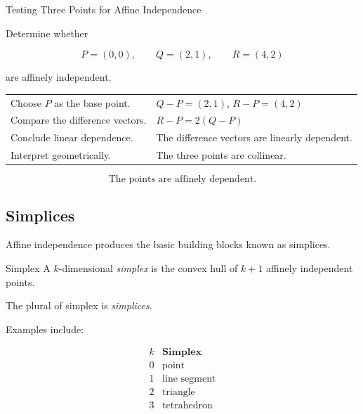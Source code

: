 \begin{workedexamplebox}{Testing Three Points for Affine Independence}

Determine whether

\[
P=(0,0),\qquad
Q=(2,1),\qquad
R=(4,2)
\]

are affinely independent.

\begin{tabularx}{\textwidth}{@{}>{\raggedright\arraybackslash}p{}X@{}}
Choose \(P\) as the base point. &
\(Q-P=(2,1)\), \quad \(R-P=(4,2)\)\\
Compare the difference vectors. &
\(R-P=2(Q-P)\)\\
Conclude linear dependence. &
The difference vectors are linearly dependent.\\
Interpret geometrically. &
The three points are collinear.
\end{tabularx}

\begin{answerbox}
\[ \boxed{\text{The points are affinely dependent.}} \]
\end{answerbox}
\end{workedexamplebox}

\subsection{Simplices}
\label{subsec:affine-simplices}

Affine independence produces the basic building blocks known as simplices.

\begin{definitionbox}{Simplex}
A \(k\)-dimensional \emph{simplex} is the convex hull of \(k+1\) affinely
independent points.
\end{definitionbox}

The plural of simplex is \emph{simplices}.

Examples include:

\[
\begin{array}{c|c}
k & \textbf{Simplex}\\
\hline
0 & \text{point}\\
1 & \text{line segment}\\
2 & \text{triangle}\\
3 & \text{tetrahedron}
\end{array}
\]

